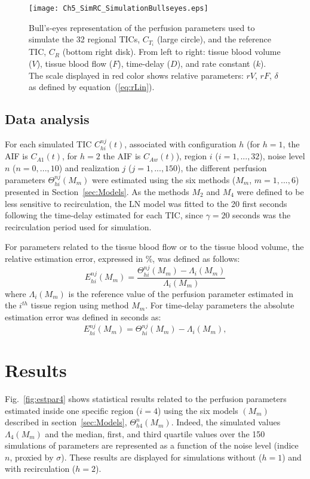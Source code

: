 \begin{figure}
\center
\texttt{[image: Ch5\_SimRC\_SimulationBullseyes.eps]}
\caption{Bull's-eyes representation of the perfusion parameters used to simulate the 32 regional TICs, $C_{T_i}$ (large circle), and the reference TIC, $C_R$ (bottom right disk). From left to right: tissue blood volume ($V$), tissue blood flow ($F$), time-delay ($D$), and rate constant ($k$). The scale displayed in red color shows relative parameters: $rV$, $rF$, $\delta$ as defined by equation~(\ref{eq:rLin}).}
\label{fig:simpar}
\vspace{-3mm}
\end{figure}

\subsection{Data analysis}
\label{sec:datana}

For each simulated TIC $C_{hi}^{nj}(t)$, associated with configuration $h$ (for $h=1$, the AIF is $C_{A1}(t)$, for $h=2$ the AIF is $C_{Aw}(t)$), region $i$ ($i=1,..., 32$), noise level $n$ ($n=0, ...,10$) and realization $j$ ($j=1,...,150$), the different perfusion parameters $\Theta_{hi}^{nj}(M_m)$ were estimated using the six methods ($M_m$, $m=1, ..., 6$) presented in Section~\ref{sec:Models}.
As the methods $M_2$ and $M_4$ were defined to be less sensitive to recirculation, the LN model was fitted to the 20 first seconds following the time-delay estimated for each TIC, since $\gamma = 20$ seconds was the recirculation period used for simulation.

For parameters related to the tissue blood flow or to the tissue blood volume, the relative estimation error, expressed in \%, was defined as follows: 
\begin{equation}
E_{hi}^{nj}(M_m) = \frac{\Theta_{hi}^{nj}(M_m) - \Lambda_{i}(M_m)}{\Lambda_{i}(M_m)}
\end{equation}
where $\Lambda_{i}(M_m)$ is the reference value of the perfusion parameter estimated in the $i^{th}$ tissue region using method $M_m$.
For time-delay parameters the absolute estimation error was defined in seconds as: 
\begin{equation}
E_{hi}^{nj}(M_m) =\Theta_{hi}^{nj}(M_m) - \Lambda_{i}(M_m),
\end{equation}

\section{Results}
Fig.~\ref{fig:estpar4} shows statistical results related to the perfusion parameters estimated inside one specific region ($i=4$) using the six models $(M_m)$ described in section~\ref{sec:Models}, $\Theta_{h4}^{n}(M_m)$.
Indeed, the simulated values $\Lambda_{4}(M_m)$ and the median, first, and third quartile values over the 150 simulations of parameters are represented as a function of the noise level (indice $n$, proxied by $\sigma$). These results are displayed for simulations without ($h=1$) and with recirculation ($h=2$).

